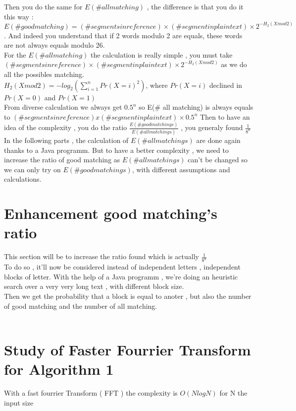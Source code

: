 \documentclass{article}
\begin{document}
Then you do the same for  $E(\# all matching)$ , the difference is that you do it this way : $E(\# good matching) = (\# segments in reference) \times (\#segment in plaintext) \times 2^{-H_{2}(X mod 2)}$ . And indeed you understand that if 2 words modulo 2 are equals, these words are not always equals modulo 26.\\
${}$\hspace{1em}For the $E(\# all matching)$ the calculation is really simple , you must take $(\# segments in reference) \times (\#segment in plaintext) \times 2^{-H_{2}(X mod 2)}$ as we do all the possibles matching.\\
$H_{2}(X mod 2) = -log_2(\sum_{i=1}^{n}{Pr(X=i)^2})$, where $Pr(X=i)$ declined in $Pr(X=0)$ and $Pr(X=1)$\\
From diverse calculation we always get $0.5^n$ so E(\# all matching) is always equals to $(\# segments in reference) x (\#segment in plaintext) \times 0.5^n$
Then to have an idea of the complexity , you do the ratio $\frac{E(\# good matchings)}{E(\# all matchings)}$ , you generaly found $\frac{1}{8^n}$\\
In the following parts , the calculation of $E(\# all matchings)$ are done again thanks to a Java programm.
But to have a better complexity , we need to increase the ratio of good matching as $E(\# all matchings)$ can't be changed so we can only try on $E(\# good matchings)$, with different assumptions and calculations.\\


\section{Enhancement good matching's ratio}

This section will be to increase the ratio found which is actually $\frac{1}{8^n}$\\
To do so , it'll now be considered instead of independent letters , independent blocks of letter.
With the help of a Java programm , we're doing an heuristic search over a very very long text , with different block size.\\
Then we get the probability that a block is equal to anoter , but also the number of good matching and the number of all matching.\\
\\

\section{Study of Faster Fourrier Transform for Algorithm 1}
With a fast fourrier Transform ( FFT ) the complexity is $O(NlogN)$ for N the input size\\
\end{document}
